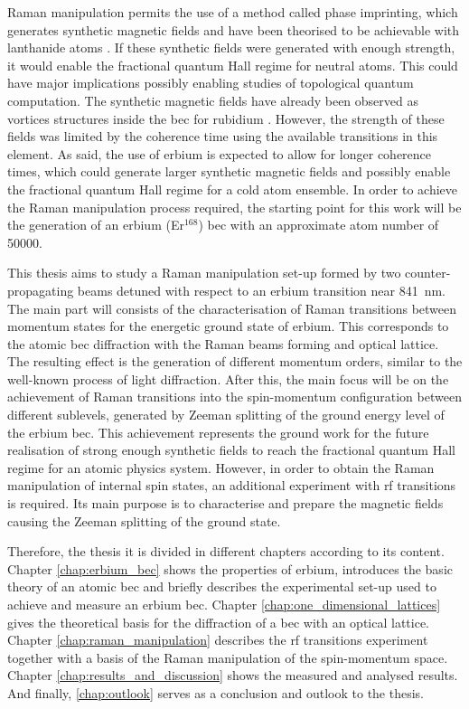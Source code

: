 Raman manipulation permits the use of a method called phase imprinting, which generates synthetic magnetic fields and have been theorised to be achievable with lanthanide atoms \cite{cui2013synthetic}. If these synthetic fields were generated with enough strength, it would enable the fractional quantum Hall regime for neutral atoms. This could have major implications possibly enabling studies of topological quantum computation. The synthetic magnetic fields have already been observed as vortices structures inside the \ac{bec} for rubidium \cite{Lin2009}. However, the strength of these fields was limited by the coherence time using the available transitions in this element. As said, the use of erbium is expected to allow for longer coherence times, which could generate larger synthetic magnetic fields and possibly enable the fractional quantum Hall regime for a cold atom ensemble. In order to achieve the Raman manipulation process required, the starting point for this work will be the generation of an erbium (Er$^\text{168}$) \acf{bec} with an approximate atom number of 50000.

This thesis aims to study a Raman manipulation set-up formed by two counter-propagating beams detuned with respect to an erbium transition near \SI{841}{\nano\meter}. The main part will consists of the characterisation of Raman transitions between momentum states for the energetic ground state of erbium. This corresponds to the atomic \ac{bec} diffraction with the Raman beams forming and optical lattice. The resulting effect is the generation of different momentum orders, similar to the well-known process of light diffraction. After this, the main focus will be on the achievement of Raman transitions into the spin-momentum configuration between different sublevels, generated by Zeeman splitting of the ground energy level of the erbium \ac{bec}. This achievement represents the ground work for the future realisation of strong enough synthetic fields to reach the fractional quantum Hall regime for an atomic physics system. However, in order to obtain the Raman manipulation of internal spin states, an additional experiment with \ac{rf} transitions is required. Its main purpose is to characterise and prepare the magnetic fields causing the Zeeman splitting of the ground state.

Therefore, the thesis it is divided in different chapters according to its content. Chapter \ref{chap:erbium_bec} shows the properties of erbium, introduces the basic theory of an atomic \ac{bec} and briefly describes the experimental set-up used to achieve and measure an erbium \ac{bec}. Chapter \ref{chap:one_dimensional_lattices} gives the theoretical basis for the diffraction of a \ac{bec} with an optical lattice. Chapter \ref{chap:raman_manipulation} describes the \ac{rf} transitions experiment together with a basis of the Raman manipulation of the spin-momentum space. Chapter \ref{chap:results_and_discussion} shows the measured and analysed results. And finally, \ref{chap:outlook} serves as a conclusion and outlook to the thesis.

